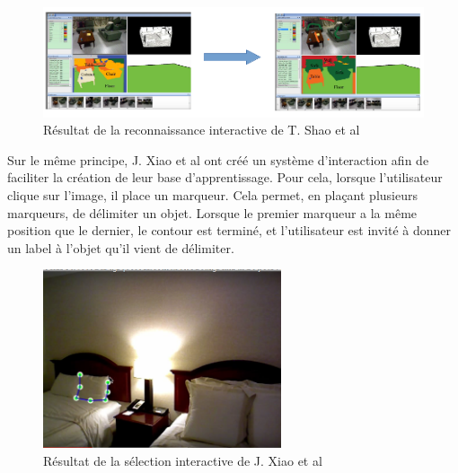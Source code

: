 \begin{figure}[!ht]
  \begin{center}
    \includegraphics[width=15cm]{image/recoInteractive1.png}
    \caption{Résultat de la reconnaissance interactive de T. Shao et al\cite{interactiveSeg}}
  \end{center}
\end{figure}

Sur le même principe, J. Xiao et al\cite{interactionSeg2}
ont créé un système d'interaction afin de faciliter la création de leur base d'apprentissage. Pour cela, lorsque l'utilisateur 
clique sur l'image, il place un marqueur. Cela permet, en plaçant plusieurs marqueurs, de délimiter un objet. Lorsque le premier
marqueur a la même position que le dernier, le contour est terminé, et l'utilisateur est invité à donner un label à l'objet
qu'il vient de délimiter.

\begin{figure}[!ht]
  \begin{center}
    \includegraphics[width=7cm]{image/segInteractive1.png}
    \caption{Résultat de la sélection interactive de J. Xiao et al\cite{interactionSeg2}}
  \end{center}
\end{figure}
